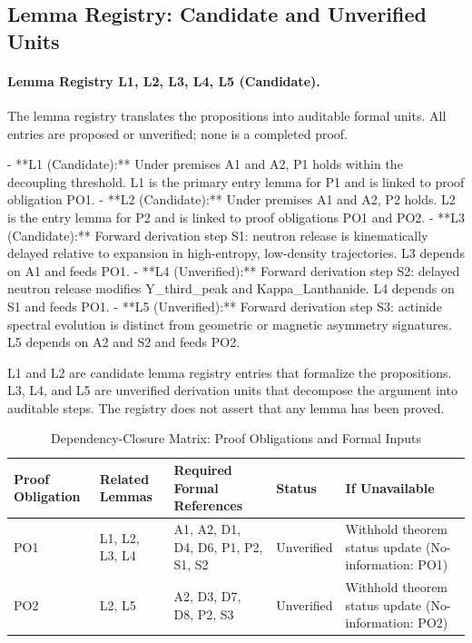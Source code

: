 \documentclass[conference]{IEEEtran}
\begin{document}
\subsection{Lemma Registry: Candidate and Unverified Units}
\paragraph{Lemma Registry L1, L2, L3, L4, L5 (Candidate).} The lemma registry translates the propositions into auditable formal units. All entries are proposed or unverified; none is a completed proof.

- **L1 (Candidate):** Under premises A1 and A2, P1 holds within the decoupling threshold. L1 is the primary entry lemma for P1 and is linked to proof obligation PO1. - **L2 (Candidate):** Under premises A1 and A2, P2 holds. L2 is the entry lemma for P2 and is linked to proof obligations PO1 and PO2. - **L3 (Candidate):** Forward derivation step S1: neutron release is kinematically delayed relative to expansion in high-entropy, low-density trajectories. L3 depends on A1 and feeds PO1. - **L4 (Unverified):** Forward derivation step S2: delayed neutron release modifies Y\_third\_peak and Kappa\_Lanthanide. L4 depends on S1 and feeds PO1. - **L5 (Unverified):** Forward derivation step S3: actinide spectral evolution is distinct from geometric or magnetic asymmetry signatures. L5 depends on A2 and S2 and feeds PO2.

L1 and L2 are candidate lemma registry entries that formalize the propositions. L3, L4, and L5 are unverified derivation units that decompose the argument into auditable steps. The registry does not assert that any lemma has been proved.

\begin{table}[htbp]
\centering
\footnotesize
\setlength{\tabcolsep}{3pt}
\renewcommand{\arraystretch}{1.12}
\caption{Dependency-Closure Matrix: Proof Obligations and Formal Inputs}
\label{tab:definitions-and-propositions-blk-6}
\begin{tabular}{|p{}|p{}|p{}|p{}|p{}|}
\hline
Proof Obligation & Related Lemmas & Required Formal References & Status & If Unavailable \\\hline
PO1 & L1, L2, L3, L4 & A1, A2, D1, D4, D6, P1, P2, S1, S2 & Unverified & Withhold theorem status update (No-information: PO1) \\\hline
PO2 & L2, L5 & A2, D3, D7, D8, P2, S3 & Unverified & Withhold theorem status update (No-information: PO2) \\\hline
\end{tabular}
\end{table}
\end{document}
